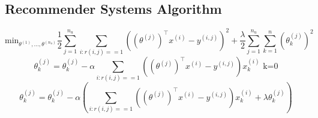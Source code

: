 \documentclass[11pt, oneside]{article}
\begin{document}
\subsection{Recommender Systems Algorithm}
	\begin{equation*}
		\text{min}_{\theta^{(1)}, ..., \theta^{(n_u)}} \frac {1}{2} \sum_{j=1}^{n_u} \sum_{i:r(i,j)==1} \left( (\theta^{(j)})^\intercal x^{(i)} - y^{(i,j)} \right)^2 + \frac {\lambda}{2} \sum_{j=1}^{n_u} \sum_{k=1}^{n} (\theta_k^{(j)})^2
	\end{equation*}
	\begin{equation*}
			\theta_k^{(j)} = \theta_k^{(j)} - \alpha \sum_{i:r(i,j)==1} \left( (\theta^{(j)})^\intercal x^{(i)} - y^{(i,j)} \right)x_k^{(i)} \text{ k=0}
	\end{equation*}
	\begin{equation*}
			\theta_k^{(j)} = \theta_k^{(j)} - \alpha \left(\sum_{i:r(i,j)==1} \left( (\theta^{(j)})^\intercal x^{(i)} - y^{(i,j)} \right)x_k^{(i)} + \lambda \theta_k^{(j)} \right)
	\end{equation*}
\end{document}
